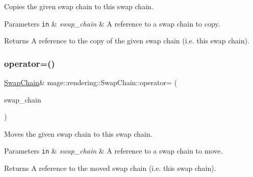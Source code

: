 Copies the given swap chain to this swap chain.


\begin{DoxyParams}[1]{Parameters}
\mbox{\tt in}  & {\em swap\+\_\+chain} & A reference to a swap chain to copy. \\
\hline
\end{DoxyParams}
\begin{DoxyReturn}{Returns}
A reference to the copy of the given swap chain (i.\+e. this swap chain). 
\end{DoxyReturn}
\hypertarget{classmage_1_1rendering_1_1_swap_chain_a815e4c6a4dfa149c4c3218f274c1850b}{}\label{classmage_1_1rendering_1_1_swap_chain_a815e4c6a4dfa149c4c3218f274c1850b} 
\subsubsection{\texorpdfstring{operator=()}{operator=()}\hspace{0.1cm}{\footnotesize\ttfamily [2/2]}}
{\footnotesize\ttfamily \hyperlink{classmage_1_1rendering_1_1_swap_chain}{Swap\+Chain}\& mage\+::rendering\+::\+Swap\+Chain\+::operator= (\begin{DoxyParamCaption}\item[{\hyperlink{classmage_1_1rendering_1_1_swap_chain}{Swap\+Chain} \&\&}]{swap\+\_\+chain }\end{DoxyParamCaption})\hspace{0.3cm}{\ttfamily [delete]}}

Moves the given swap chain to this swap chain.


\begin{DoxyParams}[1]{Parameters}
\mbox{\tt in}  & {\em swap\+\_\+chain} & A reference to a swap chain to move. \\
\hline
\end{DoxyParams}
\begin{DoxyReturn}{Returns}
A reference to the moved swap chain (i.\+e. this swap chain). 
\end{DoxyReturn}
\hypertarget{classmage_1_1rendering_1_1_swap_chain_a6739d35cf37b6d50adc70eb09cba2446}{}\label{classmage_1_1rendering_1_1_swap_chain_a6739d35cf37b6d50adc70eb09cba2446} 

